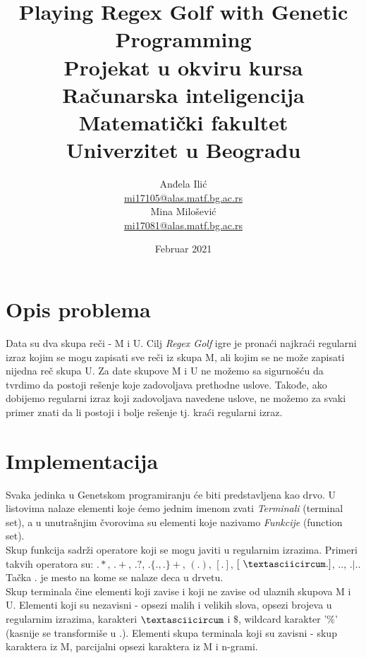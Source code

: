 \documentclass{article}
\title{%
  Playing Regex Golf with Genetic Programming \vspace{0.4cm} \\ 
  \large Projekat u okviru kursa Računarska inteligencija \\
  Matematički fakultet\\ Univerzitet u Beogradu \vspace*{0.5cm}}
\author{Anđela Ilić \\
\href{mailto:mi17105@alas.matf.bg.ac.rs}{mi17105@alas.matf.bg.ac.rs} \\
Mina Milošević \\
\href{mailto:mi17081@alas.matf.bg.ac.rs}{mi17081@alas.matf.bg.ac.rs} \\
}
\date{\vspace*{1cm}Februar 2021}
\begin{document}
\maketitle

\newpage

\renewcommand*\contentsname{Sadržaj}
\tableofcontents
\newpage

\section{Opis problema}
Data su dva skupa reči - M i U. Cilj \textit{Regex Golf} igre je pronaći najkraći regularni izraz kojim se mogu zapisati sve reči iz skupa M, ali kojim se ne može zapisati nijedna reč skupa U. Za date skupove M i U ne možemo sa sigurnošću da tvrdimo da postoji rešenje koje zadovoljava prethodne uslove. Takođe, ako dobijemo regularni izraz koji zadovoljava navedene uslove, ne možemo za svaki primer znati da li postoji i bolje rešenje tj. kraći regularni izraz. 

\section{Implementacija}
Svaka jedinka u Genetskom programiranju će biti predstavljena kao drvo.
U listovima nalaze elementi koje ćemo jednim imenom zvati \textit{Terminali} (terminal set), a u unutrašnjim čvorovima su elementi koje nazivamo \textit{Funkcije} (function set). \\
Skup funkcija sadrži operatore koji se mogu javiti u regularnim izrazima. Primeri takvih operatora su: $.*$, $.+$, $.?$, $.\{.,.\}+$, $(.)$, $[.]$,
$[\ \textasciicircum .]$, $..$, $.|.$. Tačka $.$ je mesto na kome se nalaze
deca u drvetu. \\
Skup terminala čine elementi koji zavise i koji ne zavise od ulaznih skupova M i U. Elementi koji su nezavisni - opsezi malih i velikih slova, opsezi brojeva u
regularnim izrazima, karakteri $\textasciicircum$ i $\$$, wildcard karakter
'$\%$' (kasnije se transformiše u .). Elementi skupa terminala koji su zavisni - skup karaktera iz M, parcijalni opsezi karaktera iz M i n-grami.
\end{document}
